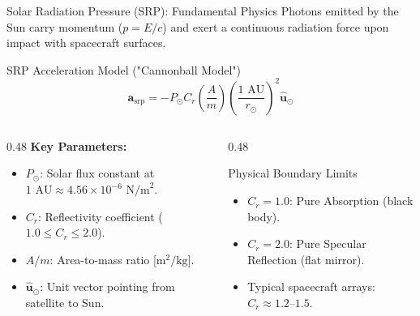 \documentclass[aspectratio=169,11pt]{beamer}
\begin{document}
\begin{frame}{Solar Radiation Pressure (SRP): Fundamental Physics}
    Photons emitted by the Sun carry momentum ($p = E/c$) and exert a continuous radiation force upon impact with spacecraft surfaces.

    \begin{block}{SRP Acceleration Model ("Cannonball Model")}
        \begin{equation*}
            \mathbf{a}_{\text{srp}} = - P_{\odot} C_r \left(\frac{A}{m}\right) \left(\frac{1\text{ AU}}{r_{\odot}}\right)^2 \hat{\mathbf{u}}_{\odot}
        \end{equation*}
    \end{block}

    \begin{columns}[t]
        \begin{column}{0.48\textwidth}
            \textbf{Key Parameters:}
            \begin{itemize}
                \item $P_{\odot}$: Solar flux constant at $1\text{ AU} \approx 4.56 \times 10^{-6}\text{ N/m}^2$.
                \item $C_r$: Reflectivity coefficient ($1.0 \le C_r \le 2.0$).
                \item $A/m$: Area-to-mass ratio [$\text{m}^2/\text{kg}$].
                \item $\hat{\mathbf{u}}_{\odot}$: Unit vector pointing from satellite to Sun.
            \end{itemize}
        \end{column}

        \begin{column}{0.48\textwidth}
            \begin{block}{Physical Boundary Limits}
                \begin{itemize}
                    \item $C_r = 1.0$: Pure Absorption (black body).
                    \item $C_r = 2.0$: Pure Specular Reflection (flat mirror).
                    \item Typical spacecraft arrays: $C_r \approx 1.2\text{--}1.5$.
                \end{itemize}
            \end{block}
        \end{column}
    \end{columns}
\end{frame}
\end{document}
